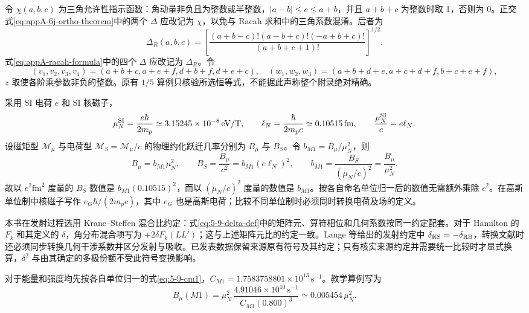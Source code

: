 令 $\chi(a,b,c)$ 为三角允许性指示函数：角动量非负且为整数或半整数，$|a-b|\le c\le a+b$，并且 $a+b+c$ 为整数时取 1，否则为 0。正交式\eqref{eq:appA-6j-ortho-theorem}中的两个 $\Delta$ 应改记为 $\chi$，以免与 Racah 求和中的三角系数混淆。后者为
\[
\Delta_R(a,b,c)=\left[\frac{(a+b-c)!(a-b+c)!(-a+b+c)!}{(a+b+c+1)!}\right]^{1/2}.
\]
式\eqref{eq:appA-racah-formula}中的四个 $\Delta$ 应改记为 $\Delta_R$。令
\[
(v_1,v_2,v_3,v_4)=(a+b+c,a+e+f,d+b+f,d+e+c),\quad
(w_1,w_2,w_3)=(a+b+d+e,a+c+d+f,b+c+e+f),
\]
$z$ 取使各阶乘参数非负的整数。原有 $1/5$ 算例只核验所选恒等式，不能据此声称整个附录绝对精确。

采用 SI 电荷 $e$ 和 SI 核磁子，
\begin{equation}\label{eq:appA-mun-def}
\mu_N^{\rm SI}=\frac{e\hbar}{2m_p}\simeq3.15245\times10^{-8}\,\mathrm{eV/T},\qquad
\ell_N=\frac{\hbar}{2m_pc}\simeq0.10515\,\mathrm{fm},\qquad
\frac{\mu_N^{\rm SI}}{c}=e\ell_N.
\end{equation}
设磁矩型 $\mathcal M_\mu$ 与电荷型 $\mathcal M_S=\mathcal M_\mu/c$ 的物理约化跃迁几率分别为 $B_\mu$ 与 $B_S$。令 $b_{M1}=B_\mu/\mu_N^2$，则
\begin{equation}\label{eq:appA-bs-bmu-trans}
B_\mu=b_{M1}\mu_N^2,\qquad
B_S=\frac{B_\mu}{c^2}=b_{M1}(e\ell_N)^2,\qquad
b_{M1}=\frac{B_S}{(\mu_N/c)^2}=\frac{B_\mu}{\mu_N^2}.
\end{equation}
故以 $e^2\mathrm{fm}^2$ 度量的 $B_S$ 数值是 $b_{M1}(0.10515)^2$，而以 $(\mu_N/c)^2$ 度量的数值是 $b_{M1}$。按各自命名单位归一后的数值无需额外乘除 $c^2$。在高斯单位制中核磁子写作 $e_G\hbar/(2m_pc)$，其中 $e_G$ 也是高斯电荷；比较不同单位制时必须同时转换电荷及场的定义。

本书在发射过程选用 Krane--Steffen 混合比约定：式\eqref{eq:5-9-delta-def}中的矩阵元、算符相位和几何系数按同一约定配套。对于 Hamilton 的 $F_k$ 和其定义的 $\delta$，角分布混合项写为 $+2\delta F_k(LL')$；这与上述矩阵元比的约定一致。Lange 等给出的发射约定中 $\delta_{\rm KS}=-\delta_{\rm RB}$，转换文献时还必须同步转换几何干涉系数并区分发射与吸收。已发表数据保留来源原有符号及其约定；只有核实来源约定并需要统一比较时才显式换算，$\delta^2$ 与由其确定的多极份额不受此符号变换影响。

对于能量和强度均先按各自单位归一的式\eqref{eq:5-9-cm1}，$C_{M1}=1.7583758801\times10^{13}\,\mathrm{s}^{-1}$。教学算例写为
\[
B_\mu(M1)=\mu_N^2\,
\frac{4.91046\times10^{10}\,\mathrm{s}^{-1}}
{C_{M1}(0.800)^3}\simeq0.005454\,\mu_N^2.
\]
